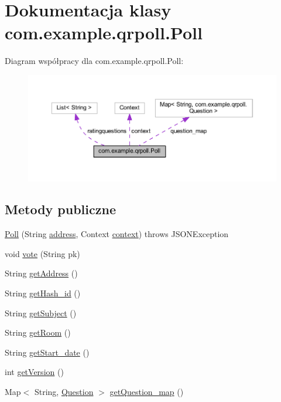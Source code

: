 \hypertarget{classcom_1_1example_1_1qrpoll_1_1_poll}{\section{Dokumentacja klasy com.\+example.\+qrpoll.\+Poll}
\label{classcom_1_1example_1_1qrpoll_1_1_poll}
}


Diagram współpracy dla com.\+example.\+qrpoll.\+Poll\+:\nopagebreak
\begin{figure}[H]
\begin{center}
\leavevmode
\includegraphics[width=350pt]{classcom_1_1example_1_1qrpoll_1_1_poll__coll__graph}
\end{center}
\end{figure}
\subsection*{Metody publiczne}
\begin{DoxyCompactItemize}
\item 
\hyperlink{classcom_1_1example_1_1qrpoll_1_1_poll_a67b9e49c516a9c614e1e9964f151ed5e}{Poll} (String \hyperlink{classcom_1_1example_1_1qrpoll_1_1_poll_a284d664b1db022d0fe8f089c4cad5ead}{address}, Context \hyperlink{classcom_1_1example_1_1qrpoll_1_1_poll_a22159bb6ccaf5330c7691c47fcb0ea00}{context})  throws J\+S\+O\+N\+Exception
\item 
void \hyperlink{classcom_1_1example_1_1qrpoll_1_1_poll_a18e558fa9d47671bff6fd21eaf7d4a10}{vote} (String pk)
\item 
String \hyperlink{classcom_1_1example_1_1qrpoll_1_1_poll_ac84c3d1747b6eb8d4f43da448de8080f}{get\+Address} ()
\item 
String \hyperlink{classcom_1_1example_1_1qrpoll_1_1_poll_ab6bbc4a6d847d1f6b64543007c3a551c}{get\+Hash\+\_\+id} ()
\item 
String \hyperlink{classcom_1_1example_1_1qrpoll_1_1_poll_af744727f34328a8fec2cb1aba1bc5f66}{get\+Subject} ()
\item 
String \hyperlink{classcom_1_1example_1_1qrpoll_1_1_poll_a4622b5c93daf183b787ecad660a207ad}{get\+Room} ()
\item 
String \hyperlink{classcom_1_1example_1_1qrpoll_1_1_poll_a51e13329a38c4ee0fc09ccac02ae5afe}{get\+Start\+\_\+date} ()
\item 
int \hyperlink{classcom_1_1example_1_1qrpoll_1_1_poll_a6ec1751ddf25a1b00173e1c4f3203458}{get\+Version} ()
\item 
Map$<$ String, \hyperlink{classcom_1_1example_1_1qrpoll_1_1_question}{Question} $>$ \hyperlink{classcom_1_1example_1_1qrpoll_1_1_poll_a505fc3d6479ef24c04adb022acc366c8}{get\+Question\+\_\+map} ()
\end{DoxyCompactItemize}
